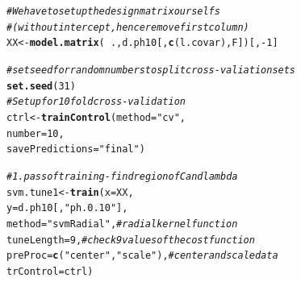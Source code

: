 \documentclass[11pt,a4paper,twoside]{article}\usepackage[]{graphicx}\usepackage[]{color}
\makeatletter
\newcommand{\hlnum}[1]{\textcolor[rgb]{0.686,0.059,0.569}{#1}}%
\newcommand{\hlstr}[1]{\textcolor[rgb]{0.192,0.494,0.8}{#1}}%
\newcommand{\hlcom}[1]{\textcolor[rgb]{0.678,0.584,0.686}{\textit{#1}}}%
\newcommand{\hlopt}[1]{\textcolor[rgb]{0,0,0}{#1}}%
\newcommand{\hlstd}[1]{\textcolor[rgb]{0.345,0.345,0.345}{#1}}%
\newcommand{\hlkwb}[1]{\textcolor[rgb]{0.69,0.353,0.396}{#1}}%
\newcommand{\hlkwc}[1]{\textcolor[rgb]{0.333,0.667,0.333}{#1}}%
\newcommand{\hlkwd}[1]{\textcolor[rgb]{0.737,0.353,0.396}{\textbf{#1}}}%
\newenvironment{kframe}{%
 \def\at@end@of@kframe{}%
 \ifinner\ifhmode%
  \def\at@end@of@kframe{\end{minipage}}%
  \begin{minipage}{\columnwidth}%
 \fi\fi%
 \def\FrameCommand##1{\hskip\@totalleftmargin \hskip-\fboxsep
 \colorbox{shadecolor}{##1}\hskip-\fboxsep
     \hskip-\linewidth \hskip-\@totalleftmargin \hskip\columnwidth}%
 \MakeFramed {\advance\hsize-\width
   \@totalleftmargin\z@ \linewidth\hsize
   \@setminipage}}%
 {\par\unskip\endMakeFramed%
 \at@end@of@kframe}
\newenvironment{knitrout}{}{} %
\makeatother
\begin{document}
\begin{knitrout}
\color{fgcolor}\begin{kframe}
\begin{alltt}
\hlcom{# We have to set up the design matrix ourselfs }
\hlcom{# (without intercept, hence remove first column) }
\hlstd{XX} \hlkwb{<-} \hlkwd{model.matrix}\hlstd{(} \hlopt{~}\hlstd{., d.ph10[,} \hlkwd{c}\hlstd{(l.covar), F])[,}\hlopt{-}\hlnum{1}\hlstd{]}

\hlcom{# set seed for random numbers to split cross-valiation sets}
\hlkwd{set.seed}\hlstd{(}\hlnum{31}\hlstd{)}
\hlcom{# Setup for 10fold cross-validation}
\hlstd{ctrl} \hlkwb{<-} \hlkwd{trainControl}\hlstd{(}\hlkwc{method}\hlstd{=}\hlstr{"cv"}\hlstd{,}
                     \hlkwc{number}\hlstd{=}\hlnum{10}\hlstd{,}
                     \hlkwc{savePredictions} \hlstd{=} \hlstr{"final"}\hlstd{)}

\hlcom{# 1. pass of training - find region of C and lambda }
\hlstd{svm.tune1} \hlkwb{<-} \hlkwd{train}\hlstd{(}\hlkwc{x} \hlstd{= XX,}
                   \hlkwc{y} \hlstd{= d.ph10[,} \hlstr{"ph.0.10"}\hlstd{],}
                   \hlkwc{method} \hlstd{=} \hlstr{"svmRadial"}\hlstd{,} \hlcom{# radial kernel function}
                   \hlkwc{tuneLength} \hlstd{=} \hlnum{9}\hlstd{,} \hlcom{# check 9 values of the cost function}
                   \hlkwc{preProc} \hlstd{=} \hlkwd{c}\hlstd{(}\hlstr{"center"}\hlstd{,}\hlstr{"scale"}\hlstd{),} \hlcom{# center and scale data}
                   \hlkwc{trControl}\hlstd{=ctrl)}


\end{alltt}
\end{kframe}
\end{knitrout}
\end{document}
